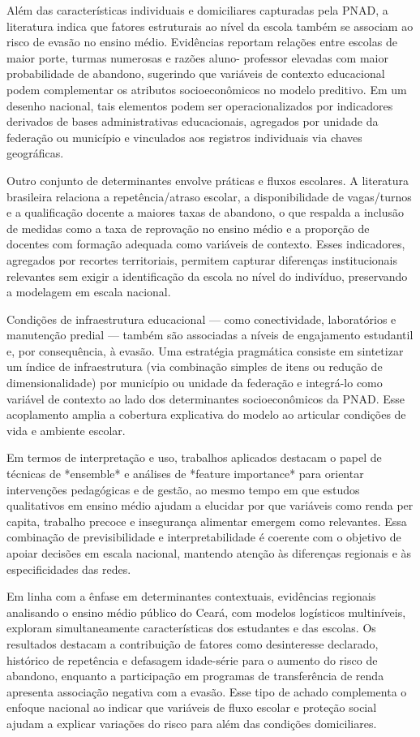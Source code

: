 \documentclass[english, spanish, brazilian]{RBIEarticle} %
\begin{document}
Além das características individuais e domiciliares capturadas pela PNAD, a literatura indica que
fatores estruturais ao nível da escola também se associam ao risco de evasão no ensino médio.
Evidências reportam relações entre escolas de maior porte, turmas numerosas e razões aluno-
professor elevadas com maior probabilidade de abandono, sugerindo que variáveis de contexto
educacional podem complementar os atributos socioeconômicos no modelo preditivo. Em um
desenho nacional, tais elementos podem ser operacionalizados por indicadores derivados de bases
administrativas educacionais, agregados por unidade da federação ou município e vinculados aos
registros individuais via chaves geográficas.

Outro conjunto de determinantes envolve práticas e fluxos escolares. A literatura brasileira
relaciona a repetência/atraso escolar, a disponibilidade de vagas/turnos e a qualificação docente a
maiores taxas de abandono, o que respalda a inclusão de medidas como a taxa de reprovação no
ensino médio e a proporção de docentes com formação adequada como variáveis de contexto. Esses
indicadores, agregados por recortes territoriais, permitem capturar diferenças institucionais
relevantes sem exigir a identificação da escola no nível do indivíduo, preservando a modelagem em
escala nacional.

Condições de infraestrutura educacional — como conectividade, laboratórios e manutenção
predial — também são associadas a níveis de engajamento estudantil e, por consequência, à evasão.
Uma estratégia pragmática consiste em sintetizar um índice de infraestrutura (via combinação
simples de itens ou redução de dimensionalidade) por município ou unidade da federação e
integrá-lo como variável de contexto ao lado dos determinantes socioeconômicos da PNAD. Esse
acoplamento amplia a cobertura explicativa do modelo ao articular condições de vida e ambiente
escolar.

Em termos de interpretação e uso, trabalhos aplicados destacam o papel de técnicas de *ensemble*
e análises de *feature importance* para orientar intervenções pedagógicas e de gestão, ao mesmo
tempo em que estudos qualitativos em ensino médio ajudam a elucidar por que variáveis como renda
per capita, trabalho precoce e insegurança alimentar emergem como relevantes. Essa combinação de
previsibilidade e interpretabilidade é coerente com o objetivo de apoiar decisões em escala
nacional, mantendo atenção às diferenças regionais e às especificidades das redes.

Em linha com a ênfase em determinantes contextuais, evidências regionais analisando o ensino
médio público do Ceará, com modelos logísticos multiníveis, exploram simultaneamente
características dos estudantes e das escolas. Os resultados destacam a contribuição de fatores como
desinteresse declarado, histórico de repetência e defasagem idade-série para o aumento do risco de
abandono, enquanto a participação em programas de transferência de renda apresenta associação
negativa com a evasão. Esse tipo de achado complementa o enfoque nacional ao indicar que
variáveis de fluxo escolar e proteção social ajudam a explicar variações do risco para além das
condições domiciliares.
\end{document}
